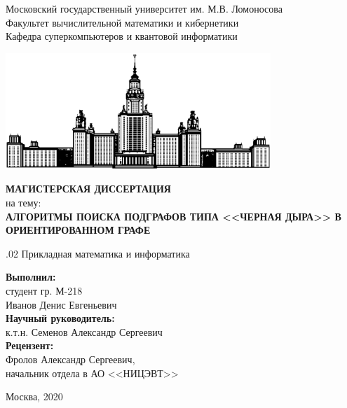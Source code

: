 \documentclass[12pt,a4paper,oneside,openany]{article}
\theoremstyle{definition}
\theoremstyle{lemma}
\theoremstyle{remark}
\begin{document}
\begin{titlepage}
        \begin{center}

        \bigskip

        {\large Московский государственный университет им. М.В. Ломоносова} \\

        {\large Факультет вычислительной математики и кибернетики} \\
        {\large Кафедра суперкомпьютеров и квантовой информатики} \\
        \bigskip

        \includegraphics[width=10cm]{msu.eps}

        \bigskip
        \bigskip
        \MakeTextUppercase{\textbf{\Huge Магистерская диссертация}} \\
        \bigskip
        {\large на тему:} \\
        \bigskip
        \MakeTextUppercase{\textbf{\large Алгоритмы поиска подграфов типа <<черная дыра>> в ориентированном графе}}

        .02 Прикладная математика и информатика

    \end{center}

    \bigskip
    \bigskip
    \bigskip
    \begin{flushright}
        \begin{minipage}{7cm}
            \textbf{Выполнил:} \\
            студент гр. М-218 \\
            Иванов Денис Евгеньевич \\

            \textbf{Научный руководитель:} \\
            к.т.н. Семенов Александр Сергеевич \\

            \textbf{Рецензент:} \\
            Фролов Александр Сергеевич,\\ начальник отдела в АО <<НИЦЭВТ>>
        \end{minipage}
    \end{flushright}

    \vfill

    \begin{center}
    {\large Москва, 2020}
    \end{center}

\end{titlepage}
\cleardoublepage
\end{document}
